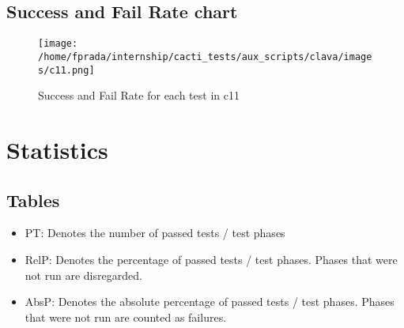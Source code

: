\documentclass{article}
\begin{document}
\subsection{Success and Fail Rate chart}
\begin{figure}[h!]
\centering
\texttt{[image: /home/fprada/internship/cacti\_tests/aux\_scripts/clava/images/c11.png]}
\caption{Success and Fail Rate for each test in c11}
\label{fig:c11}
\end{figure}
\newpage
\section{Statistics}\subsection{Tables}
\begin{itemize}
            \item PT: Denotes the number of passed tests / test phases
            \item RelP: Denotes the percentage of passed tests / test phases. Phases that were not run are disregarded.
            \item AbsP: Denotes the absolute percentage of passed tests / test phases. Phases that were not run are counted as failures.
            \end{itemize}
\end{document}
